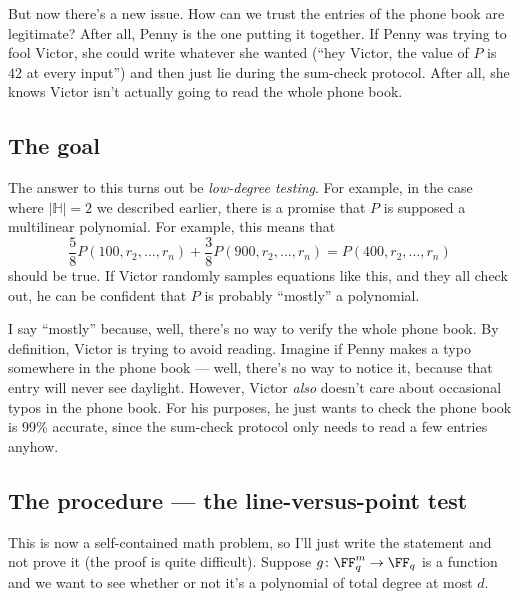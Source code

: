 \documentclass[11pt]{scrreprt}
\newcommand{\HH}{\mathbb H}
\begin{document}
But now there's a new issue.
How can we trust the entries of the phone book are legitimate?
After all, Penny is the one putting it together.
If Penny was trying to fool Victor, she could write whatever she wanted
(``hey Victor, the value of $P$ is $42$ at every input'')
and then just lie during the sum-check protocol.
After all, she knows Victor isn't actually going to read the whole phone book.

\subsection{The goal}
The answer to this turns out be \emph{low-degree testing}.
For example, in the case where $|\HH| = 2$ we described earlier,
there is a promise that $P$ is supposed a multilinear polynomial.
For example, this means that
\[ \frac58 P(100, r_2, \dots, r_n) + \frac38 P(900, r_2, \dots, r_n) = P(400, r_2, \dots, r_n) \]
should be true.
If Victor randomly samples equations like this, and they all check out,
he can be confident that $P$ is probably ``mostly'' a polynomial.

I say ``mostly'' because, well, there's no way to verify the whole phone book.
By definition, Victor is trying to avoid reading.
Imagine if Penny makes a typo somewhere in the phone book ---
well, there's no way to notice it, because that entry will never see daylight.
However, Victor \emph{also} doesn't care about occasional typos in the phone book.
For his purposes, he just wants to check the phone book is 99\% accurate,
since the sum-check protocol only needs to read a few entries anyhow.

\subsection{The procedure --- the line-versus-point test}
This is now a self-contained math problem, so I'll just write the statement
and not prove it (the proof is quite difficult).
Suppose $g \colon \FF_q^m \to \FF_q$ is a function
and we want to see whether or not it's a polynomial of total degree at most $d$.
\end{document}
